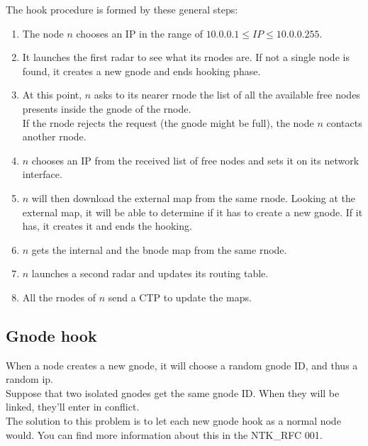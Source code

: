 \documentclass[a4paper]{article}
\begin{document}
The hook procedure is formed by these general steps:
\begin{enumerate}
	\item The node $n$ chooses an IP in the range of $10.0.0.1 \le IP \le
		10.0.0.255$.
	\item It launches the first radar to see what its rnodes are. If not a
		single node is found, it creates a new gnode and ends hooking
		phase.
	\item At this point, $n$ asks to its nearer rnode the list of all the
		available free nodes presents inside the gnode of the rnode.\\
		If the rnode rejects the request (the gnode might be full),
		the node $n$ contacts another rnode.
	\item $n$ chooses an IP from the received list of free nodes and sets
		it on its network interface.
	\item $n$ will then download the external map from the same rnode.
		Looking at the external map, it will be able to determine if
		it has to create a new gnode. If it has, it creates it and
		ends the hooking.
	\item $n$ gets the internal and the bnode map from the same rnode.
	\item $n$ launches a second radar and updates its routing table.
	\item All the rnodes of $n$ send a CTP to update the maps.
\end{enumerate}


\subsection{Gnode hook}
When a node creates a new gnode, it will choose a random gnode ID, and thus
a random ip.\\
Suppose that two isolated gnodes get the same gnode ID. When they will be
linked, they'll enter in conflict.\\
The solution to this problem is to let each new gnode hook as a normal node
would. You can find more information about this in the NTK\_RFC 001\cite{gnodecontiguity}.


%
\end{document}
